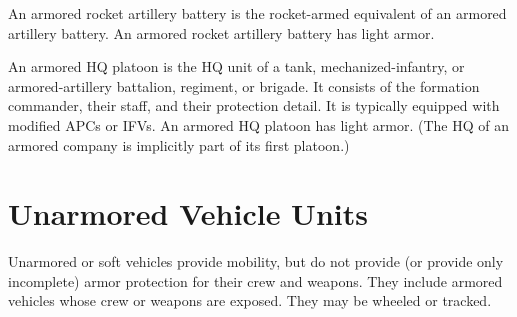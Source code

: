 \begin{withcounters}

    An armored rocket artillery battery is the rocket-armed equivalent of an armored artillery battery.
    An armored rocket artillery battery has light armor.
    \\


    An armored HQ platoon is the HQ unit of a tank, mechanized-infantry, or armored-artillery battalion, regiment, or brigade. It consists of the formation commander, their staff, and their protection detail.
    It is typically equipped with modified APCs or IFVs.
    An armored HQ platoon has light armor.
    (The HQ of an armored company is implicitly part of its first platoon.)

\end{withcounters}

\section{Unarmored Vehicle Units}

Unarmored or soft vehicles provide mobility, but do not provide (or provide only incomplete) armor protection for their crew and weapons. They include armored vehicles whose crew or weapons are exposed. They may be wheeled or tracked.

